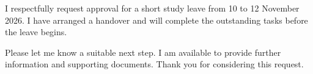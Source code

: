 I respectfully request approval for a short study leave from 10 to 12 November 2026. I have arranged a handover and will complete the outstanding tasks before the leave begins.

Please let me know a suitable next step. I am available to provide further information and supporting documents. Thank you for considering this request.
